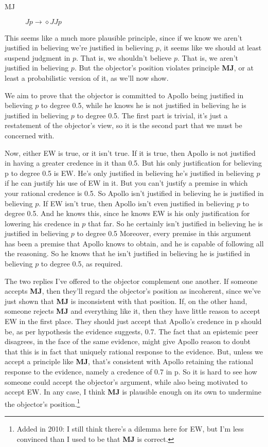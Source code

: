 \begin{description}
\item[MJ] $Jp \rightarrow \diamond JJp$
\end{description}

This seems like a much more plausible principle, since if we know we aren't justified in believing we're justified in believing $p$, it seems like we should at least suspend judgment in $p$. That is, we shouldn't believe $p$. That is, we aren't justified in believing $p$. But the objector's position violates principle \textbf{MJ}, or at least a probabilistic version of it, as we'll now show.

We aim to prove that the objector is committed to Apollo being justified in believing $p$ to degree 0.5, while he knows he is not justified in believing he is justified in believing $p$ to degree 0.5. The first part is trivial, it's just a restatement of the objector's view, so it is the second part that we must be concerned with. 

Now, either EW is true, or it isn't true. If it is true, then Apollo is not justified in having a greater credence in it than 0.5. But his only justification for believing p to degree 0.5 is EW. He's only justified in believing he's justified in believing $p$ if he can justify his use of EW in it. But you can't justify a premise in which your rational credence is 0.5. So Apollo isn't justified in believing he is justified in believing $p$. If EW isn't true, then Apollo isn't even justified in believing $p$ to degree 0.5. And he knows this, since he knows EW is his only justification for lowering his credence in $p$ that far. So he certainly isn't justified in believing he is justified in believing $p$ to degree 0.5 Moreover, every premise in this argument has been a premise that Apollo knows to obtain, and he is capable of following all the reasoning. So he knows that he isn't justified in believing he is justified in believing $p$ to degree 0.5, as required.

The two replies I've offered to the objector complement one another. If someone accepts \textbf{MJ}, then they'll regard the objector's position as incoherent, since we've just shown that \textbf{MJ} is inconsistent with that position. If, on the other hand, someone rejects \textbf{MJ} and everything like it, then they have little reason to accept EW in the first place. They should just accept that Apollo's credence in p should be, as per hypothesis the evidence suggests, 0.7. The fact that an epistemic peer disagrees, in the face of the same evidence, might give Apollo reason to doubt that this is in fact that uniquely rational response to the evidence. But, unless we accept a principle like \textbf{MJ}, that's consistent with Apollo retaining the rational response to the evidence, namely a credence of 0.7 in p. So it is hard to see how someone could accept the objector's argument, while also being motivated to accept EW. In any case, I think \textbf{MJ} is plausible enough on its own to undermine the objector's position.\footnote{Added in 2010: I still think there's a dilemma here for EW, but I'm less convinced than I used to be that \textbf{MJ} is correct.}

